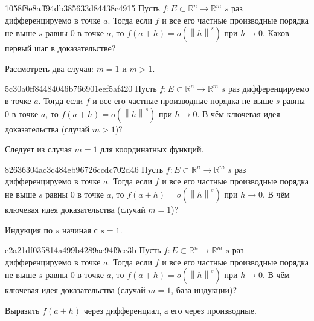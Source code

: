 \begin{note}{1058f8e8aff94db385633d84438c4915}
    Пусть \({ f : E \subset \mathbb R^{n} \to \mathbb R^{m} }\) \({ s }\) раз дифференцируемо в точке \({ a }\).
    Тогда если \({ f }\) и все его частные производные порядка не выше \({ s }\) равны \({ 0 }\) в точке \({ a }\),
    то \({ f(a + h) = o(\left\lVert h \right\rVert^{s}) }\) при \({ h \to 0 }\).
    Каков первый шаг в доказательстве?

    \begin{cloze}{1}
        Рассмотреть два случая: \({ m = 1 }\) и \({ m > 1 }\).
    \end{cloze}
\end{note}

\begin{note}{5c30a0ff84484046b766901eef5af420}
    Пусть \({ f : E \subset \mathbb R^{n} \to \mathbb R^{m} }\) \({ s }\) раз дифференцируемо в точке \({ a }\).
    Тогда если \({ f }\) и все его частные производные порядка не выше \({ s }\) равны \({ 0 }\) в точке \({ a }\),
    то \({ f(a + h) = o(\left\lVert h \right\rVert^{s}) }\) при \({ h \to 0 }\).
    В чём ключевая идея доказательства (случай \({ m > 1 }\))?

    \begin{cloze}{1}
        Следует из случая \({ m = 1 }\) для координатных функций.
    \end{cloze}
\end{note}

\begin{note}{82636304ac3c484eb96726ccdc702d46}
    Пусть \({ f : E \subset \mathbb R^{n} \to \mathbb R^{m} }\) \({ s }\) раз дифференцируемо в точке \({ a }\).
    Тогда если \({ f }\) и все его частные производные порядка не выше \({ s }\) равны \({ 0 }\) в точке \({ a }\),
    то \({ f(a + h) = o(\left\lVert h \right\rVert^{s}) }\) при \({ h \to 0 }\).
    В чём ключевая идея доказательства (случай \({ m = 1 }\))?

    \begin{cloze}{1}
        Индукция по \({ s }\) начиная с \({ s = 1 }\).
    \end{cloze}
\end{note}

\begin{note}{e2a21df035814a499b4289ae94f9ce3b}
    Пусть \({ f : E \subset \mathbb R^{n} \to \mathbb R^{m} }\) \({ s }\) раз дифференцируемо в точке \({ a }\).
    Тогда если \({ f }\) и все его частные производные порядка не выше \({ s }\) равны \({ 0 }\) в точке \({ a }\),
    то \({ f(a + h) = o(\left\lVert h \right\rVert^{s}) }\) при \({ h \to 0 }\).
    В чём ключевая идея доказательства (случай \({ m = 1 }\), база индукции)?

    \begin{cloze}{1}
        Выразить \({ f(a + h) }\) через дифференциал, а его через производные.
    \end{cloze}
\end{note}

